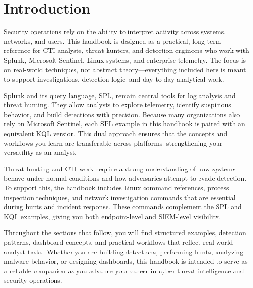\section{Introduction}

Security operations rely on the ability to interpret activity across systems, networks, and users. This handbook is designed as a practical, long-term reference for CTI analysts, threat hunters, and detection engineers who work with Splunk, Microsoft Sentinel, Linux systems, and enterprise telemetry. The focus is on real-world techniques, not abstract theory—everything included here is meant to support investigations, detection logic, and day-to-day analytical work.

Splunk and its query language, SPL, remain central tools for log analysis and threat hunting. They allow analysts to explore telemetry, identify suspicious behavior, and build detections with precision. Because many organizations also rely on Microsoft Sentinel, each SPL example in this handbook is paired with an equivalent KQL version. This dual approach ensures that the concepts and workflows you learn are transferable across platforms, strengthening your versatility as an analyst.

Threat hunting and CTI work require a strong understanding of how systems behave under normal conditions and how adversaries attempt to evade detection. To support this, the handbook includes Linux command references, process inspection techniques, and network investigation commands that are essential during hunts and incident response. These commands complement the SPL and KQL examples, giving you both endpoint-level and SIEM-level visibility.

Throughout the sections that follow, you will find structured examples, detection patterns, dashboard concepts, and practical workflows that reflect real-world analyst tasks. Whether you are building detections, performing hunts, analyzing malware behavior, or designing dashboards, this handbook is intended to serve as a reliable companion as you advance your career in cyber threat intelligence and security operations.
